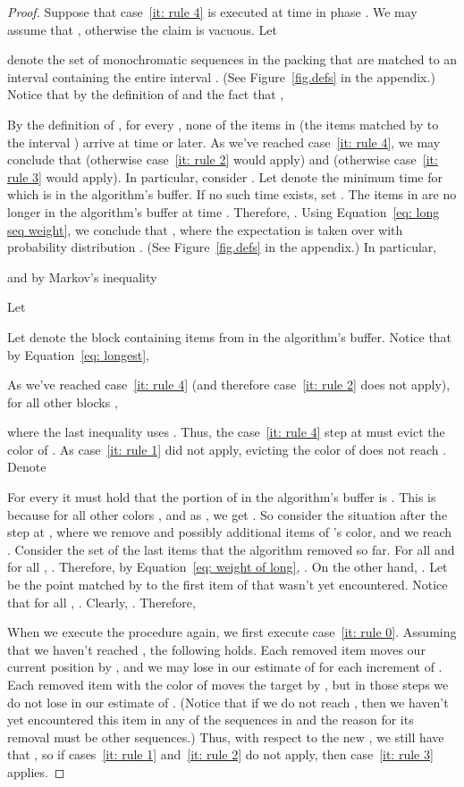 \documentclass[11pt]{article}
\begin{document}
\begin{proof}
Suppose that case~\ref{it: rule 4} is executed at time 
in phase .
We may assume that , otherwise the claim is
vacuous. Let

denote the set of monochromatic sequences
in the packing  that are matched
to an interval containing the entire interval
. (See Figure~\ref{fig.defs} in the
appendix.)
Notice that by the definition of  and the fact
that ,

By the definition of , for every ,
none of the items in  (the items
matched by  to the interval ) arrive
at time  or later. As we've reached case~\ref{it: rule 4},
we may conclude that 
(otherwise case~\ref{it: rule 2} would apply)
and 
(otherwise case~\ref{it: rule 3} would apply).
In particular, consider .
Let  denote the minimum time 
for which  is in the algorithm's
buffer. If no such time exists, set .
The items in  are no longer
in the algorithm's buffer at time . Therefore,
. Using Equation~\eqref{eq: long seq weight},
we conclude that
,
where the expectation is taken over 
with probability distribution
.
(See Figure~\ref{fig.defs} in the appendix.)
In particular,

and by Markov's inequality

Let

Let  denote the block containing items from
 in the algorithm's buffer.
Notice that by Equation~\eqref{eq: longest},

As we've reached case~\ref{it: rule 4} (and therefore case~\ref{it: rule 2}
does not apply), for all other blocks ,

where the last inequality uses
.
Thus, the case~\ref{it: rule 4} step at  must evict the color of
. As case~\ref{it: rule 1} did not apply, evicting the color
of  does not reach . Denote

For every  it must hold that the portion of
 in the algorithm's buffer is . This is because for all
other colors
,
and as , we get
.
So consider the situation after the step at , where
we remove  and possibly additional items of 's color,
and we reach . Consider the set  of the last
 items that the algorithm removed so far.
For all  and for all , .
Therefore, by Equation~\eqref{eq: weight of long},
.
On the other hand, .
Let  be the point matched by  to
the first item  of  that wasn't yet encountered.
Notice that for all , .
Clearly, . Therefore,

When we execute the procedure again, we first execute
case~\ref{it: rule 0}. Assuming that we haven't reached ,
the following holds. Each removed item moves our current
position  by , and we may lose 
in our estimate of  for each increment of .
Each removed item with the color of  moves the target 
by , but in those steps we do not lose 
in our estimate of . (Notice that if we do not
reach , then we haven't yet encountered this item in any
of the sequences in  and the reason for its removal
must be other sequences.) Thus, with respect to the new ,
we still have that
,
so if cases~\ref{it: rule 1} and~\ref{it: rule 2} do not apply,
then case~\ref{it: rule 3} applies.
\end{proof}
\end{document}
